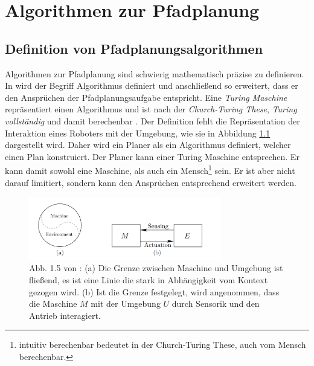 

\chapter{Algorithmen zur Pfadplanung}
\section{Definition von Pfadplanungsalgorithmen}
 

Algorithmen zur Pfadplanung sind schwierig mathematisch präzise zu definieren.
In \cite[~S. 19]{Lav06} wird der Begriff Algorithmus definiert und anschließend so erweitert, dass er den Ansprüchen der Pfadplanungsaufgabe entspricht. 
Eine \textit{Turing Maschine} repräsentiert einen Algorithmus und ist nach der \textit{Church-Turing These}, \textit{Turing vollständig} und damit berechenbar \cite{Schmitz:19}. 
Der Definition fehlt die Repräsentation der Interaktion eines Roboters mit der Umgebung, wie sie in Abbildung \ref{lav01} dargestellt wird. 
Daher wird ein Planer als ein Algorithmus definiert, welcher einen Plan konstruiert. 
Der Planer kann einer Turing Maschine entsprechen. 
Er kann damit sowohl eine Maschine, als auch ein Mensch\footnote{intuitiv berechenbar bedeutet in der Church-Turing These, auch vom Mensch berechenbar.} sein.
Er ist aber nicht darauf limitiert, sondern kann den Ansprüchen entsprechend erweitert werden.\cite[~S. 20]{Lav06}

\begin{figure} %
	\centering
	\includegraphics[width=0.75\textwidth]{images/img224.png}
	\caption{Abb. 1.5 von \cite[~S. 20]{Lav06}:  (a) Die Grenze zwischen Maschine und Umgebung ist fließend, es ist eine Linie die stark in Abhängigkeit vom Kontext gezogen wird. (b) Ist die Grenze festgelegt, wird angenommen, dass die Maschine $M$ mit der Umgebung $U$ durch Sensorik und den Antrieb interagiert.}
	\label{lav01}
\end{figure}
 
